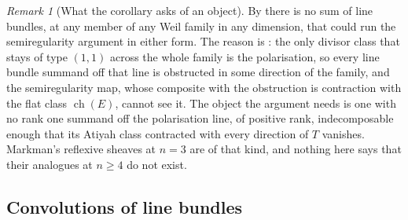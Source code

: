 \documentclass[11pt,reqno]{amsart}
\theoremstyle{plain}
\theoremstyle{definition}
\theoremstyle{remark}
\newtheorem{remark}[theorem]{Remark}
\DeclareMathOperator{\ch}{ch}
\begin{document}
\begin{remark}[What the corollary asks of an object]\label{rem:nolinemeaning}
By  there is no sum of line bundles, at any member of any
Weil family in any dimension, that could run the semiregularity argument in
either form. The reason is \cite[Proposition~9.15(i)]{paperI}: the
only divisor class that stays of type $(1,1)$ across the whole family is the
polarisation, so every line bundle summand off that line is obstructed in
some direction of the family, and the semiregularity map, whose composite
with the obstruction is contraction with the flat class $\ch(E)$, cannot see
it. The object the argument needs is one with no rank one
summand off the polarisation line, of positive rank, indecomposable enough
that its Atiyah class contracted with every direction of $T$ vanishes.
Markman's reflexive sheaves at $n=3$ are of that kind, and nothing here
says that their analogues at $n\ge4$ do not exist.
\end{remark}

\subsection{Convolutions of line bundles}\label{ssec:convolutions}
\end{document}
